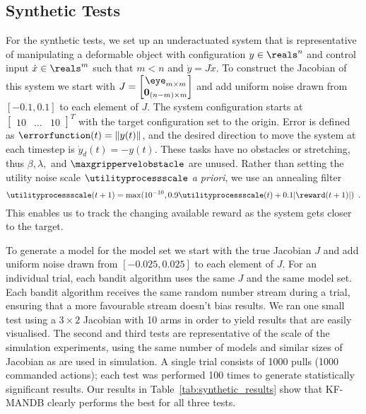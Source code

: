 \subsection{Synthetic Tests}
\label{sec:synthetic_trials}


For the synthetic tests, we set up an underactuated system that is representative of manipulating a deformable object with configuration $y \in \reals^n$ and control input $\dot x \in \reals^m$ such that $m < n$ and $\dot y = J \dot x$. To construct the Jacobian of this system we start with $J = \begin{bmatrix}\eye_{m \times m} \\ \mathbf{0}_{(n-m) \times m} \end{bmatrix}$ and add uniform noise drawn from $[-0.1, 0.1]$ to each element of $J$. The system configuration starts at $\begin{bmatrix}10 & \dots & 10\end{bmatrix}^T$ with the target configuration set to the origin. Error is defined as $\errorfunction(t) = \| y(t) \|$, and the desired direction to move the system at each timestep is $\dot y_d(t) = - y(t)$. These tasks have no obstacles or stretching, thus $\beta, \lambda,$ and $\maxgrippervelobstacle$ are unused. Rather than setting the utility noise scale $\utilityprocessscale$ \textit{a priori}, we use an annealing filter
\begin{equation}
    \utilityprocessscale(t+1) = \max(10^{-10}, 0.9 \utilityprocessscale(t) + 0.1 |\reward(t+1)|) \enspace.
\end{equation}
This enables us to track the changing available reward as the system gets closer to the target.

To generate a model for the model set we start with the true Jacobian $J$ and add uniform noise drawn from $[-0.025, 0.025]$ to each element of $J$. For an individual trial, each bandit algorithm uses the same $J$ and the same model set. Each bandit algorithm receives the same random number stream during a trial, ensuring that a more favourable stream doesn't bias results. We ran one small test using a $3 \times 2$ Jacobian with 10 arms in order to yield results that are easily visualised. The second and third tests are representative of the scale of the simulation experiments, using the same number of models and similar sizes of Jacobian as are used in simulation. A single trial consists of 1000 pulls (1000 commanded actions); each test was performed 100 times to generate statistically significant results. Our results in Table~\ref{tab:synthetic_results} show that KF-MANDB clearly performs the best for all three tests.


